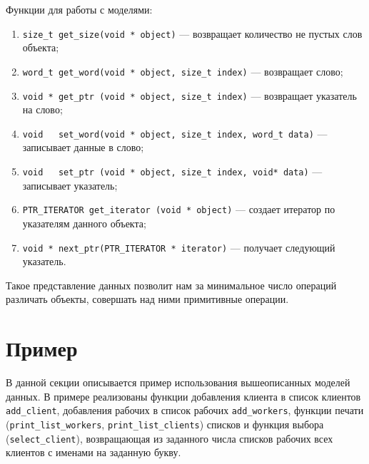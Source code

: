 Функции для работы с моделями:
\begin{enumerate}
\item \lstinline{size_t get_size(void * object)} --- возвращает количество не пустых слов объекта; 
\item \lstinline{word_t get_word(void * object, size_t index)} --- возвращает слово;
\item \lstinline{void * get_ptr (void * object, size_t index)} --- возвращает указатель на слово;
\item \lstinline{void   set_word(void * object, size_t index, word_t data)} --- записывает данные в слово;
\item \lstinline{void   set_ptr (void * object, size_t index, void* data)} --- записывает указатель;
\item \lstinline{PTR_ITERATOR get_iterator (void * object)} --- создает итератор по указателям данного объекта;
\item \lstinline{void * next_ptr(PTR_ITERATOR * iterator)} --- получает следующий указатель.
\end{enumerate}
Такое представление данных позволит нам за минимальное число операций различать объекты, совершать над ними примитивные операции.


\section{Пример}
В данной секции описывается пример использования вышеописанных моделей данных.
В примере реализованы функции добавления клиента в список клиентов \lstinline{add_client}, добавления рабочих в список рабочих \lstinline{add_workers}, 
функции печати (\lstinline{print_list_workers}, \lstinline{print_list_clients}) списков и функция выбора (\lstinline{select_client}),
возвращающая из заданного числа списков рабочих всех клиентов с именами на заданную букву.  

